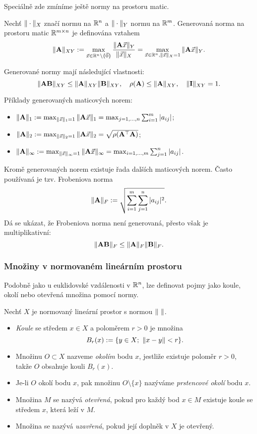 Speciálně zde zmíníme ještě normy na prostoru matic.
\begin{df}
Nechť $\|\cdot\|_X$ značí normu na $\mathbb R^n$ a $\|\cdot\|_Y$ normu na $\mathbb R^m$.
Generovaná norma na prostoru matic $\mathbb R^{m\times n}$  je definována vztahem
\[ \|\mathbf{A}\|_{XY} := \max_{\vec{x}\in\mathbb R^n\setminus\{\vec 0\}}\frac{\|\mathbf{A}\vec{x}\|_Y}{\|\vec{x}\|_X} = \max_{\vec{x}\in\mathbb R^n,\|\vec{x}\|_X=1}\|\mathbf{A}\vec{x}\|_Y. \]
\end{df}
Generované normy mají následující vlastnosti:
\[ \|\mathbf{A}\mathbf{B}\|_{XY} \le \|\mathbf{A}\|_{XY}\|\mathbf{B}\|_{XY},\quad \rho(\mathbf{A})\le\|\mathbf{A}\|_{XY},\quad \|\mathbf{I}\|_{XY}=1. \]
\begin{ex}
Příklady generovaných maticových norem:
\begin{itemize}
\item $\|\mathbf{A}\|_1:=\max_{\|\vec{x}\|_1=1}\|\mathbf{A}\vec{x}\|_1 = \max_{j=1,\ldots,n}\sum_{i=1}^m|a_{ij}|$;
\item $\|\mathbf{A}\|_2:=\max_{\|\vec{x}\|_2=1}\|\mathbf{A}\vec{x}\|_2 = \sqrt{\rho(\mathbf{A}^\top\mathbf{A})}$;
\item $\|\mathbf{A}\|_\infty:=\max_{\|\vec{x}\|_\infty=1}\|\mathbf{A}\vec{x}\|_\infty = \max_{i=1,\ldots,m}\sum_{j=1}^n|a_{ij}|$.
\end{itemize}
\end{ex}
Kromě generovaných norem existuje řada dalších maticových norem.
Často používaná je tzv. Frobeniova norma
\[ \|\mathbf{A}\|_F:=\sqrt{\sum_{i=1}^m\sum_{j=1}^n|a_{ij}|^2}. \]
Dá se ukázat, že Frobeniova norma není generovaná, přesto však je multiplikativní:
\[ \|\mathbf{A}\mathbf{B}\|_F \le \|\mathbf{A}\|_F\|\mathbf{B}\|_F. \]



\subsubsection{Množiny v normovaném lineárním prostoru}
% 
Podobně jako u euklidovské vzdálenosti v $\mathbb R^n$, lze definovat pojmy jako koule, okolí nebo otevřená množina pomocí normy.
\begin{df}
Nechť $X$ je normovaný lineární prostor s normou $\|\ \|$.
\begin{itemize}
\item \emph{Koule} se středem $x\in X$ a poloměrem $r>0$ je množina
\[ B_r(x) := \{y\in X;~\|x-y\|<r\}. \]
\item Množinu $O\subset X$ nazveme \emph{okolím} bodu $x$, jestliže existuje poloměr $r>0$, takže $O$ obsahuje kouli $B_r(x)$.
\item Je-li $O$ okolí bodu $x$, pak množinu $O\setminus\{x\}$ nazýváme \emph{prstencové okolí} bodu $x$.
\item Množina $M$ se nazývá \emph{otevřená}, pokud pro každý bod $x\in M$ existuje koule se středem $x$, která leží v $M$.
\item Množina se nazývá \emph{uzavřená}, pokud její doplněk v $X$ je otevřený.
\end{itemize}
\end{df}

